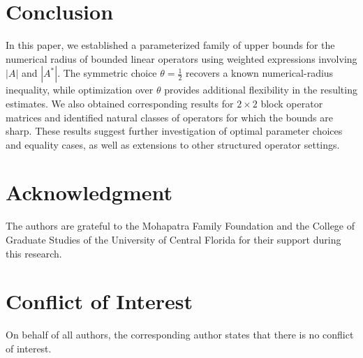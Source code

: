 \documentclass[final,1p,times]{elsarticle}
\begin{document}
\section{Conclusion}

In this paper, we established a parameterized family of upper bounds for the
numerical radius of bounded linear operators using weighted expressions
involving $|A|$ and $|A^*|$. The symmetric choice $\theta=\frac12$ recovers
a known numerical-radius inequality, while optimization over $\theta$ provides
additional flexibility in the resulting estimates. We also obtained
corresponding results for $2\times2$ block operator matrices and identified
natural classes of operators for which the bounds are sharp. These results
suggest further investigation of optimal parameter choices and equality cases,
as well as extensions to other structured operator settings.


\section{Acknowledgment}  The authors are grateful to the Mohapatra Family Foundation and the College of Graduate Studies of the University of Central Florida for their support during this research. 

\section{Conflict of Interest} 
On behalf of all authors, the corresponding author states that there is no conflict of interest.
\end{document}
